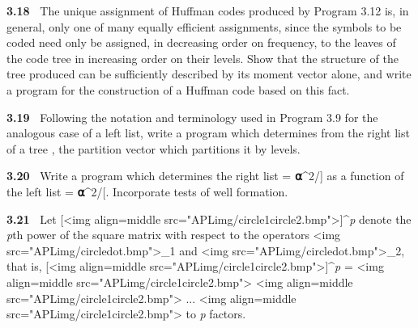 {\par \textbf{3.18\ } The unique assignment of Huffman codes produced by Program 3.12 is, in general, only one of many equally efficient assignments, since the symbols to be coded need only be assigned, in decreasing order on frequency, to the leaves of the code tree in increasing order on their levels. Show that the structure of the tree produced can be sufficiently described by its moment vector alone, and write a program for the construction of a Huffman code based on this fact.



\par \textbf{3.19\ } Following the notation and terminology used in Program 3.9 for the analogous case of a left list, write a program which determines from the right list  of a tree , the partition vector  which partitions it by levels.



\par \textbf{3.20\ } Write a program which determines the right list 
 = \textbf{⍺}^{2}/] as a function of the left list 
 = \textbf{⍺}^{2}/[. Incorporate tests of well formation.



\par \textbf{3.21\ } Let [<img align=middle src="APLimg/circle1circle2.bmp">]^{\textit{p}} denote the \textit{p}th power of the square matrix  with respect to the operators 
<img src="APLimg/circledot.bmp">_{1} and 
<img src="APLimg/circledot.bmp">_{2}, that is, [<img align=middle src="APLimg/circle1circle2.bmp">]^{\textit{p}} = 
 <img align=middle src="APLimg/circle1circle2.bmp">
 <img align=middle src="APLimg/circle1circle2.bmp"> ... 
<img align=middle src="APLimg/circle1circle2.bmp">  to \textit{p} factors.

}
